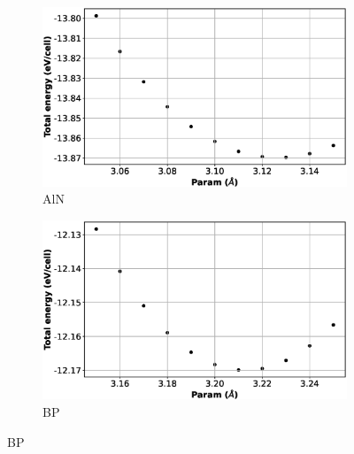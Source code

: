 \begin{figure}[htb]
    \centering %
\begin{subfigure}{0.45\textwidth}
  \includegraphics[width=\linewidth]{images/aln_2d_opt.eps}
  \caption{AlN}
\end{subfigure}\hfil %
\begin{subfigure}{0.45\textwidth}
  \includegraphics[width=\linewidth]{images/bp_2d_opt.eps}
  \caption{BP}
\end{subfigure}

\medskip


\end{figure}
